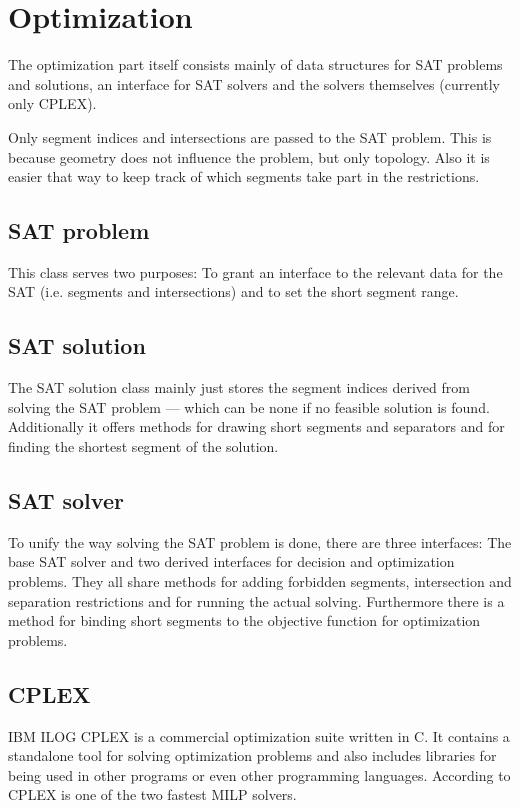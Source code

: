 \section{Optimization}
The optimization part itself consists mainly of data structures for
SAT problems and solutions, an interface for SAT solvers and the
solvers themselves (currently only CPLEX).

Only segment indices and intersections are passed to the SAT problem.
This is because geometry does not influence the problem, but only
topology. Also it is easier that way to keep track of which segments
take part in the restrictions.

\subsection{SAT problem}
This class serves two purposes: To grant an interface to the relevant
data for the SAT (i.e. segments and intersections) and to set the
short segment range.

\subsection{SAT solution}
The SAT solution class mainly just stores the segment indices derived
from solving the SAT problem --- which can be none if no feasible
solution is found. Additionally it offers methods for drawing short
segments and separators and for finding the shortest segment of the
solution.

\subsection{SAT solver}
To unify the way solving the SAT problem is done, there are three
interfaces: The base SAT solver and two derived interfaces for
decision and optimization problems. They all share methods for adding
forbidden segments, intersection and separation restrictions and for
running the actual solving. Furthermore there is a method for binding
short segments to the objective function for optimization problems.

\subsection{CPLEX}
\label{sec:cplex}
IBM ILOG CPLEX \cite{cplex}
is a commercial optimization suite written in C. It contains a
standalone tool for solving optimization problems and also includes
libraries for being used in other programs or even other programming
languages. According to \cite{cplex_benchmark}
CPLEX is one of the two fastest MILP solvers.

